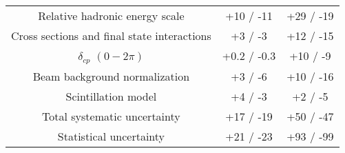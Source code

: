 \begin{table*}[t]
\begin{tabular}{c c c}
Relative hadronic energy scale & +10 / -11 & +29 /  -19\\
Cross sections and final state interactions & +3 /  -3  & +12 /  -15 \\ 
$\delta_{cp}$ $(0 - 2\pi)$ & +0.2 / -0.3 & +10 /  -9 \\
Beam background normalization & +3 /  -6 & +10 /  -16 \\ 
Scintillation model & +4 /  -3   & +2 / -5 \\
\hline 
Total systematic uncertainty & +17 / -19 & +50 / -47 \\
\hline
Statistical uncertainty & +21 /  -23 & +93 /  -99  \\
\hline
\end{tabular}
\label{tab:systShifts}
\end{table*}


